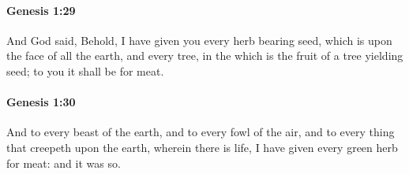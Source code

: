 		\paragraph{Genesis 1:29} %
			\label{GENESIS-1-29}

			And God said, Behold, I have given you every herb bearing seed, which is upon the face of all the earth, and every tree, in the which is the fruit of a tree yielding seed; to you it shall be for meat.


		\paragraph{Genesis 1:30} %
			\label{GENESIS-1-30}

			And to every beast of the earth, and to every fowl of the air, and to every thing that creepeth upon the earth, wherein there is life, I have given every green herb for meat: and it was so.

